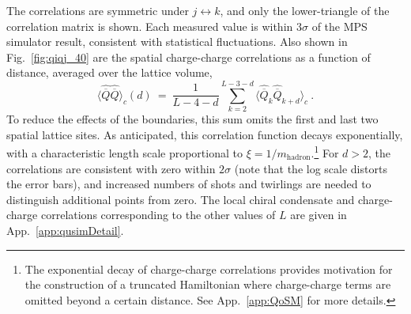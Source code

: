 \documentclass[aps, pra, onecolumn, tightenlines, letterpaper, amsmath, amssymb, preprintnumbers, floatfix, longbibliography, nofootinbib]{revtex4-2}
\begin{document}
%
The correlations are symmetric under $j\leftrightarrow k$, 
and only the lower-triangle of the correlation matrix is shown.
Each measured value is within $3\sigma$ of the MPS simulator result, consistent with statistical fluctuations.
Also shown in Fig.~\ref{fig:qiqj_40} are the spatial charge-charge correlations as a function of distance, averaged over the lattice volume,
%
\begin{equation}
\langle \hat{\overline{Q}} \hat{\overline{Q}} \rangle_c (d) \ = \ \frac{1}{L-4-d}\sum_{k=2}^{L-3-d} \langle \hat{\overline{Q}}_k \hat{\overline{Q}}_{k+d} \rangle_c \ .
\end{equation}
%
To reduce the effects of the boundaries, this sum omits the first and last two spatial lattice sites.
As anticipated, this correlation function decays exponentially, with a characteristic length scale proportional to $\xi = 1/m_{\text{hadron}}$.\footnote{The exponential decay of charge-charge correlations provides motivation for the construction of a truncated Hamiltonian where charge-charge terms are omitted beyond a certain distance. See App.~\ref{app:QoSM} for more details.}
For $d>2$, the correlations are consistent with zero within $2\sigma$ (note that the log scale distorts the error bars),
and 
increased numbers of shots and twirlings 
are needed to distinguish additional points from zero.
The local chiral condensate and charge-charge correlations corresponding to the other values of $L$ are given in App.~\ref{app:qusimDetail}.










\end{document}
